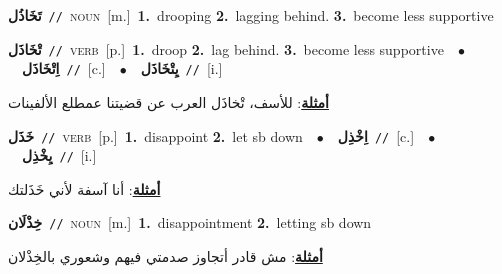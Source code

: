 \documentclass[10pt,a4paper,twoside]{article} %
\begin{document}
\begin{multicols}{2}
{\setlength\topsep{0pt}\textbf{\foreignlanguage{arabic}{تَخَاذُل}}\ {\color{gray}\texttt{//}\color{black}}\ \textsc{noun}\ [m.]\ \textbf{1.}~drooping  \textbf{2.}~lagging behind.  \textbf{3.}~become less supportive\ } \vspace{2mm}

{\setlength\topsep{0pt}\textbf{\foreignlanguage{arabic}{تْخَاذَل}}\ {\color{gray}\texttt{//}\color{black}}\ \textsc{verb}\ [p.]\ \textbf{1.}~droop  \textbf{2.}~lag behind.  \textbf{3.}~become less supportive\ \ $\bullet$\ \ \setlength\topsep{0pt}\textbf{\foreignlanguage{arabic}{اِتْخَاذَل}}\ {\color{gray}\texttt{//}\color{black}}\ [c.]\ \ $\bullet$\ \ \setlength\topsep{0pt}\textbf{\foreignlanguage{arabic}{يِتْخَاذَل}}\ {\color{gray}\texttt{//}\color{black}}\ [i.]\  \begin{flushright}\color{gray}\foreignlanguage{arabic}{\textbf{\underline{\foreignlanguage{arabic}{أمثلة}}}: للأسف، تْخاذَل العرب عن قضيتنا عمطلع الألفينات}\end{flushright}\color{black}} \vspace{2mm}

{\setlength\topsep{0pt}\textbf{\foreignlanguage{arabic}{خَذَل}}\ {\color{gray}\texttt{//}\color{black}}\ \textsc{verb}\ [p.]\ \textbf{1.}~disappoint  \textbf{2.}~let sb down\ \ $\bullet$\ \ \setlength\topsep{0pt}\textbf{\foreignlanguage{arabic}{اِخْذِل}}\ {\color{gray}\texttt{//}\color{black}}\ [c.]\ \ $\bullet$\ \ \setlength\topsep{0pt}\textbf{\foreignlanguage{arabic}{يِخْذِل}}\ {\color{gray}\texttt{//}\color{black}}\ [i.]\  \begin{flushright}\color{gray}\foreignlanguage{arabic}{\textbf{\underline{\foreignlanguage{arabic}{أمثلة}}}: أنا آسفة لأني خَذَلتك}\end{flushright}\color{black}} \vspace{2mm}

{\setlength\topsep{0pt}\textbf{\foreignlanguage{arabic}{خِذْلَان}}\ {\color{gray}\texttt{//}\color{black}}\ \textsc{noun}\ [m.]\ \textbf{1.}~disappointment  \textbf{2.}~letting sb down\  \begin{flushright}\color{gray}\foreignlanguage{arabic}{\textbf{\underline{\foreignlanguage{arabic}{أمثلة}}}: مش قادر أتجاوز صدمتي فيهم وشعوري بالخِذْلان}\end{flushright}\color{black}} \vspace{2mm}


\end{multicols}
\end{document}
